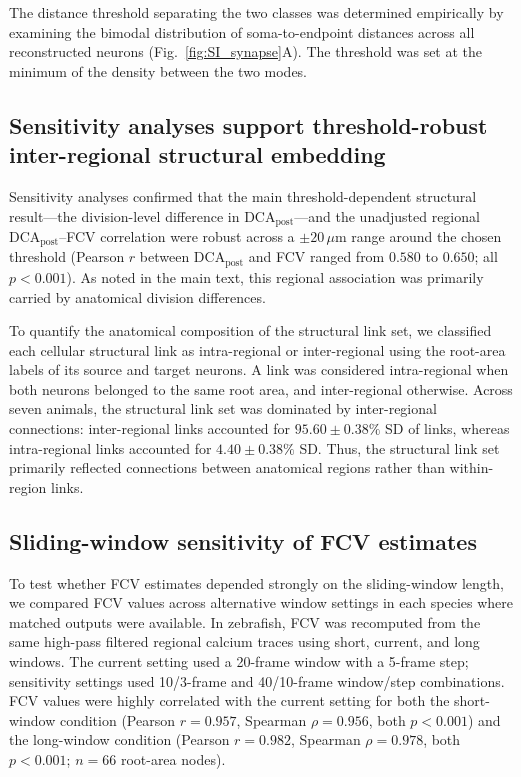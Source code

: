 \documentclass[9pt,twoside]{pnas-new}
\begin{document}
The distance threshold separating the two classes was determined empirically by examining the bimodal distribution of soma-to-endpoint distances across all reconstructed neurons (Fig.~\ref{fig:SI_synapse}A). The threshold was set at the minimum of the density between the two modes. 

\subsection*{Sensitivity analyses support threshold-robust inter-regional structural embedding}

Sensitivity analyses confirmed that the main threshold-dependent structural result---the division-level difference in $\mathrm{DCA}_{\mathrm{post}}$---and the unadjusted regional $\mathrm{DCA}_{\mathrm{post}}$--FCV correlation were robust across a $\pm 20\,\mu$m range around the chosen threshold (Pearson $r$ between $\mathrm{DCA}_{\mathrm{post}}$ and FCV ranged from $0.580$ to $0.650$; all $p < 0.001$). As noted in the main text, this regional association was primarily carried by anatomical division differences.

To quantify the anatomical composition of the structural link set, we classified each cellular structural link as intra-regional or inter-regional using the root-area labels of its source and target neurons. A link was considered intra-regional when both neurons belonged to the same root area, and inter-regional otherwise. Across seven animals, the structural link set was dominated by inter-regional connections: inter-regional links accounted for $95.60 \pm 0.38\%$ SD of links, whereas intra-regional links accounted for $4.40 \pm 0.38\%$ SD\@. Thus, the structural link set primarily reflected connections between anatomical regions rather than within-region links.

\subsection*{Sliding-window sensitivity of FCV estimates}

To test whether FCV estimates depended strongly on the sliding-window length, we compared FCV values across alternative window settings in each species where matched outputs were available. In zebrafish, FCV was recomputed from the same high-pass filtered regional calcium traces using short, current, and long windows. The current setting used a 20-frame window with a 5-frame step; sensitivity settings used 10/3-frame and 40/10-frame window/step combinations. FCV values were highly correlated with the current setting for both the short-window condition (Pearson $r=0.957$, Spearman $\rho=0.956$, both $p<0.001$) and the long-window condition (Pearson $r=0.982$, Spearman $\rho=0.978$, both $p<0.001$; $n=66$ root-area nodes).
\end{document}
